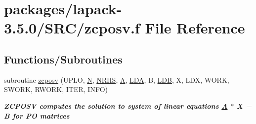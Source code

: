 \hypertarget{zcposv_8f}{}\section{packages/lapack-\/3.5.0/\+S\+R\+C/zcposv.f File Reference}
\label{zcposv_8f}
\subsection*{Functions/\+Subroutines}
\begin{DoxyCompactItemize}
\item 
subroutine \hyperlink{group__complex16POsolve_gae1f1548257a84b4328773c60eefb8934}{zcposv} (U\+P\+L\+O, \hyperlink{polmisc_8c_a0240ac851181b84ac374872dc5434ee4}{N}, \hyperlink{example__user_8c_aa0138da002ce2a90360df2f521eb3198}{N\+R\+H\+S}, \hyperlink{classA}{A}, \hyperlink{example__user_8c_ae946da542ce0db94dced19b2ecefd1aa}{L\+D\+A}, B, \hyperlink{example__user_8c_a50e90a7104df172b5a89a06c47fcca04}{L\+D\+B}, X, L\+D\+X, W\+O\+R\+K, S\+W\+O\+R\+K, R\+W\+O\+R\+K, I\+T\+E\+R, I\+N\+F\+O)
\begin{DoxyCompactList}\small\item\em {\bfseries  Z\+C\+P\+O\+S\+V computes the solution to system of linear equations \hyperlink{classA}{A} $\ast$ X = B for P\+O matrices} \end{DoxyCompactList}\end{DoxyCompactItemize}
